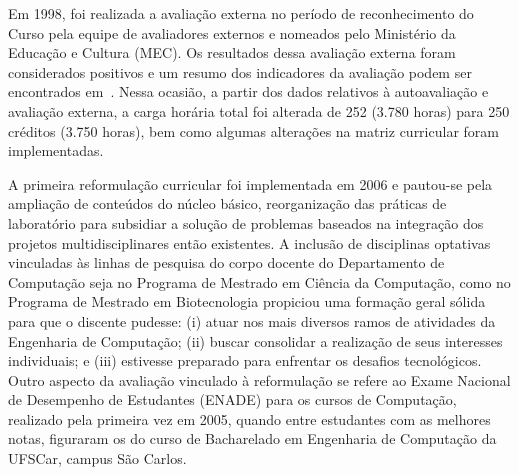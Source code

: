 Em 1998, foi realizada a avaliação externa no período de reconhecimento do Curso pela equipe de avaliadores externos e nomeados pelo Ministério da Educação e Cultura (MEC). Os resultados dessa avaliação externa foram considerados positivos e um resumo dos indicadores da avaliação podem ser encontrados em~\textcite{CPA}. Nessa ocasião, a partir dos dados relativos à autoavaliação e avaliação externa, a carga horária total foi alterada de 252 (3.780 horas) para 250 créditos (3.750 horas), bem como algumas alterações na matriz curricular foram implementadas.


A primeira reformulação curricular foi implementada em 2006 e pautou-se pela ampliação de conteúdos do núcleo básico, reorganização das práticas de laboratório para subsidiar a solução de problemas baseados na integração dos projetos multidisciplinares então existentes. A inclusão de disciplinas optativas vinculadas às linhas de pesquisa do corpo docente do Departamento de Computação seja no Programa de Mestrado em Ciência da Computação, como no Programa de Mestrado em Biotecnologia propiciou uma formação geral sólida para que o discente pudesse: (i) atuar nos mais diversos ramos de atividades da Engenharia de Computação; (ii) buscar consolidar a realização de seus interesses individuais; e (iii) estivesse preparado para enfrentar os desafios tecnológicos. Outro aspecto da avaliação vinculado à reformulação se refere ao Exame Nacional de Desempenho de Estudantes (ENADE) para os cursos de Computação, realizado pela primeira vez em 2005, quando entre estudantes com as melhores notas, figuraram os do curso de Bacharelado em Engenharia de Computação da UFSCar, campus São Carlos.

